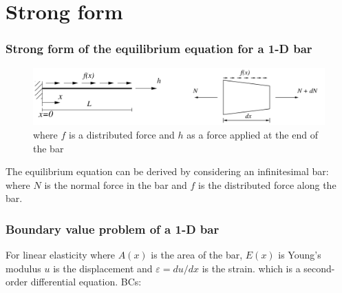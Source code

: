 \documentclass[handout]{beamer}
\begin{document}
\section{Strong form}

\begin{frame}
\frametitle{Strong form of the equilibrium equation for a 1-D bar}
\begin{figure}
	\includegraphics[width=\textwidth]{figs/strong-form-1d-bar.png}
	\caption*{where $f$ is a distributed force and $h$ as a force applied at the end of the bar}
\end{figure}
The equilibrium equation can be derived by considering an infinitesimal bar: 
where $N$ is the normal force in the bar and $f$ is the distributed force along the bar.
\end{frame}

\begin{frame}
\frametitle{Boundary value problem of a 1-D bar}
For linear elasticity
where $A(x)$ is the area of the bar, $E(x)$ is Young’s modulus $u$ is the displacement and $\varepsilon =
du/dx$ is the strain.
which is a second-order differential equation. BCs:

\end{frame}
\end{document}
